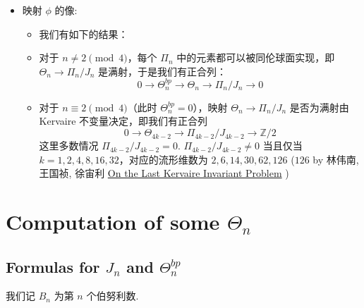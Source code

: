 \documentclass[
]{ctexart}
\providecommand{\tightlist}{%
  \setlength{\itemsep}{0pt}\setlength{\parskip}{0pt}}
\begin{document}
\begin{itemize}
\tightlist
\item
  映射 \(\phi\) 的像:

  \begin{itemize}
  \item
    我们有如下的结果：
  \item
    对于 \(n \neq 2 \pmod{4}\)，每个 \(\Pi_n\)
    中的元素都可以被同伦球面实现，即 \(\Theta_n \to \Pi_n/J_n\)
    是满射，于是我们有正合列： \[
      0 \to \Theta_n^{bp} \to \Theta_n \to \Pi_n/J_n \to 0
      \]
  \item
    对于 \(n \equiv 2 \pmod{4}\)（此时 \(\Theta_n^{bp} = 0\)），映射
    \(\Theta_n \to \Pi_n/J_n\) 是否为满射由 Kervaire
    不变量决定，即我们有正合列 \[
      0 \to \Theta_{4k-2} \to \Pi_{4k-2}/J_{4k-2} \to \mathbb{Z}/2
      \] 这里多数情况 \(\Pi_{4k-2}/J_{4k-2} = 0\).
    \(\Pi_{4k-2}/J_{4k-2}\neq 0\) 当且仅当
    \(k = 1,2,4,8,16,32\)，对应的流形维数为 \(2,6,14,30,62,126\)
    (\(126\) by 林伟南, 王国祯, 徐宙利
    \href{https://arxiv.org/abs/2412.10879}{On the Last Kervaire
    Invariant Problem} )
  \end{itemize}
\end{itemize}

\section{\texorpdfstring{Computation of some
\(\Theta_n\)}{Computation of some \textbackslash Theta\_n}}\label{computation-of-some-theta_n}

\subsection{\texorpdfstring{Formulas for \(J_n\) and
\(\Theta_n^{bp}\)}{Formulas for J\_n and \textbackslash Theta\_n\^{}\{bp\}}}\label{formulas-for-j_n-and-theta_nbp}

我们记 \(B_n\) 为第 \(n\) 个伯努利数.
\end{document}
